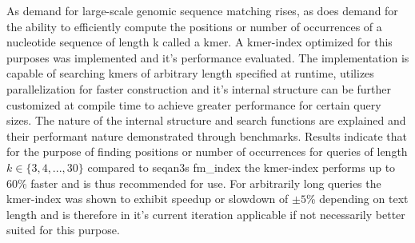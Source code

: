 \author{Clemens~Cords}
\newcommand{\matrikelno}{4872639}
\newcommand{\email}{clemens.cords@fu-berlin.de}

\newcommand{\supervisor}{Prof. Dr. Knut Reinert}
\newcommand{\supervisorUniversity}{Freie Universit\"at Berlin}
\newcommand{\supervisorDepartment}{Dept. of Computer Science and Mathematics}
\newcommand{\supervisorAG}{Algorithmische Bioinformatik}
\newcommand{\supervisorCountry}{Germany}

\newcommand{\fstAdvisor}{Enrico Seiler}
\newcommand{\fstAdvisorsUniversity}{Freie Universit\"at Berlin}
\newcommand{\fstAdvisorsDepartment}{Dept. of Computer Science and Mathematics}
\newcommand{\fstAdvisorsAG}{Algorithmische Bioinformatik}
\newcommand{\fstAdvisorsCountry}{Germany}

\newcommand{\sndAdvisor}{Prof. Dr. Knut Reinert}
\newcommand{\sndAdvisorsUniversity}{Freie Universit\"at Berlin} %
\newcommand{\sndAdvisorsCountry}{Germany}



\begin{abstractEN}
As demand for large-scale genomic sequence matching rises, as does
demand for the ability to efficiently compute the positions or number of occurrences
of a nucleotide sequence of length k called a kmer. A kmer-index optimized for this
purposes was implemented and it's performance evaluated. The implementation
is capable of searching kmers of arbitrary length specified at runtime,
utilizes parallelization for faster construction and it's internal
structure can be further customized at compile time to achieve greater
performance for certain query sizes. The nature of the internal structure
and search functions are explained and their performant nature demonstrated
through benchmarks. Results indicate that for the purpose of finding
positions or number of occurrences for queries of
length $k\in\{3,4,...,30\}$ compared to seqan3s fm\_index the kmer-index
performs up to 60\% faster and is thus recommended for use. For arbitrarily
long queries the kmer-index was shown to exhibit speedup or slowdown
of $\pm5$\% depending on text length and is therefore in it's current
iteration applicable if not necessarily better suited for this purpose.
\end{abstractEN}
\vfill

